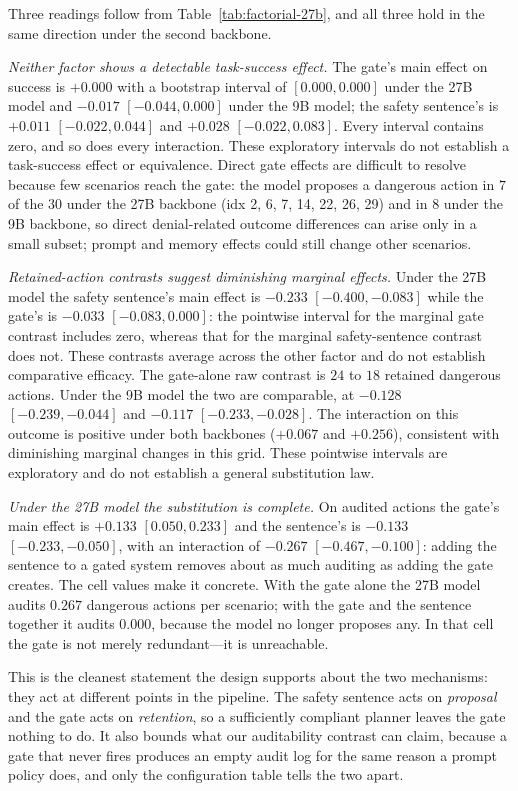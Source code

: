 \documentclass[11pt]{article}
\begin{document}
Three readings follow from Table~\ref{tab:factorial-27b}, and all three hold in the
same direction under the second backbone.

\emph{Neither factor shows a detectable task-success effect.} The gate's main effect on success is
$+0.000$ with a bootstrap interval of $[0.000, 0.000]$ under the 27B model and
$-0.017$ $[-0.044, 0.000]$ under the 9B model; the safety sentence's is $+0.011$
$[-0.022, 0.044]$ and $+0.028$ $[-0.022, 0.083]$. Every interval contains zero, and so
does every interaction. These exploratory intervals do not establish a task-success effect or equivalence. Direct gate effects are difficult to resolve because few scenarios reach the gate: the model proposes a
dangerous action in $7$ of the $30$ under the 27B backbone (idx 2, 6, 7, 14, 22, 26, 29)
and in $8$ under the 9B backbone, so direct denial-related outcome differences can arise only in a small subset; prompt and memory effects could still change other scenarios.

\emph{Retained-action contrasts suggest diminishing marginal effects.} Under the 27B model the safety sentence's main effect is $-0.233$
$[-0.400, -0.083]$ while the gate's is $-0.033$ $[-0.083, 0.000]$: the pointwise interval for the marginal gate contrast includes zero, whereas that for the marginal safety-sentence contrast does not. These contrasts average across the other factor and do not establish comparative efficacy. The gate-alone raw contrast is $24$ to $18$ retained dangerous actions. Under
the 9B model the two are comparable, at $-0.128$ $[-0.239, -0.044]$ and $-0.117$
$[-0.233, -0.028]$. The interaction on this outcome is positive under both backbones
($+0.067$ and $+0.256$), consistent with diminishing marginal changes in this grid. These pointwise intervals are exploratory and do not establish a general substitution law.

\emph{Under the 27B model the substitution is complete.} On audited actions the gate's
main effect is $+0.133$ $[0.050, 0.233]$ and the sentence's is $-0.133$
$[-0.233, -0.050]$, with an interaction of $-0.267$ $[-0.467, -0.100]$: adding the
sentence to a gated system removes about as much auditing as adding the gate creates.
The cell values make it concrete. With the gate alone the 27B model audits $0.267$
dangerous actions per scenario; with the gate and the sentence together it audits
$\mathbf{0.000}$, because the model no longer proposes any. In that cell the gate is
not merely redundant---it is unreachable.

This is the cleanest statement the design supports about the two mechanisms: they act
at different points in the pipeline. The safety sentence acts on \emph{proposal} and the
gate acts on \emph{retention}, so a sufficiently compliant planner leaves the gate
nothing to do. It also bounds what our auditability contrast can claim, because a gate
that never fires produces an empty audit log for the same reason a prompt policy does,
and only the configuration table tells the two apart.
\end{document}
